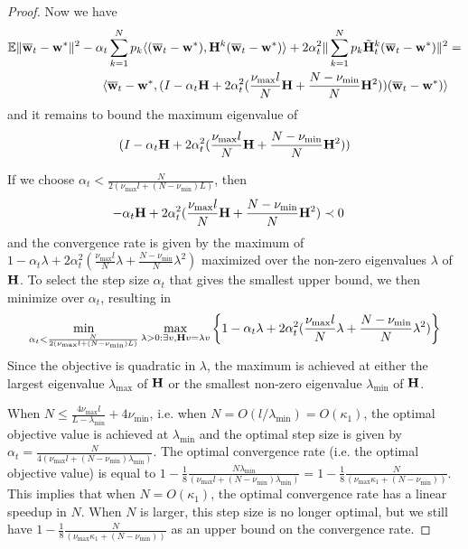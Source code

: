 \begin{proof}
	Now we have 
	\begin{align*}
	\mathbb{E}\|{\overline{\mathbf{w}}}_{t}-{\mathbf{w}}^{\ast}\|^{2}-\alpha_{t}\sum_{k=1}^{N}p_{k}\langle({\overline{\mathbf{w}}}_{t}-{\mathbf{w}}^{\ast}),{\mathbf{H}}^{k}({\overline{\mathbf{w}}}_{t}-{\mathbf{w}}^{\ast})\rangle+2\alpha_{t}^{2}\|\sum_{k=1}^{N}p_{k}\tilde{{\mathbf{H}}}_{t}^{k}({\overline{\mathbf{w}}}_{t}-{\mathbf{w}}^{\ast})\|^{2} & =\\
	\langle{\overline{\mathbf{w}}}_{t}-{\mathbf{w}}^{\ast},(I-\alpha_{t}{\mathbf{H}}+2\alpha_{t}^{2}(\frac{\nu_{\max}l}{N}{\mathbf{H}}+\frac{N-\nu_{\min}}{N}{\mathbf{H}}^{2}))({\overline{\mathbf{w}}}_{t}-{\mathbf{w}}^{\ast})\rangle
	\end{align*}
	and it remains to bound the maximum eigenvalue of 
	\begin{align*}
	(I-\alpha_{t}{\mathbf{H}}+2\alpha_{t}^{2}(\frac{\nu_{\max}l}{N}{\mathbf{H}}+\frac{N-\nu_{\min}}{N}{\mathbf{H}}^{2}))
	\end{align*}
	
	If we choose $\alpha_{t}<\frac{N}{2(\nu_{\max}l+(N-\nu_{\min})L)}$,
	then 
	\begin{align*}
	-\alpha_{t}{\mathbf{H}}+2\alpha_{t}^{2}(\frac{\nu_{\max}l}{N}{\mathbf{H}}+\frac{N-\nu_{\min}}{N}{\mathbf{H}}^{2}) & \prec0
	\end{align*}
	and the convergence rate is given by the maximum of $1-\alpha_{t}\lambda+2\alpha_{t}^{2}(\frac{\nu_{\max}l}{N}\lambda+\frac{N-\nu_{\min}}{N}\lambda^{2})$
	maximized over the non-zero eigenvalues $\lambda$ of ${\mathbf{H}}$. To select
	the step size $\alpha_{t}$ that gives the smallest upper bound, we
	then minimize over $\alpha_{t}$, resulting in 
	\begin{align*}
	\min_{\alpha_{t}<\frac{N}{2(\nu_{\max}l+(N-\nu_{\min})L)}}\max_{\lambda>0:\exists v,{\mathbf{H}} v=\lambda v}\left\{ 1-\alpha_{t}\lambda+2\alpha_{t}^{2}(\frac{\nu_{\max}l}{N}\lambda+\frac{N-\nu_{\min}}{N}\lambda^{2})\right\} 
	\end{align*}
	Since the objective is quadratic in $\lambda$, the maximum is achieved
	at either the largest eigenvalue $\lambda_{\max}$ of ${\mathbf{H}}$ or the
	smallest non-zero eigenvalue $\lambda_{\min}$ of ${\mathbf{H}}$. 
	
	When $N\leq\frac{4\nu_{\max}l}{L-\lambda_{\min}}+4\nu_{\min}$, i.e.
	when $N=O(l/\lambda_{\min})=O(\kappa_{1})$, the optimal objective
	value is achieved at $\lambda_{\min}$ and the optimal step size is
	given by $\alpha_{t}=\frac{N}{4(\nu_{\max}l+(N-\nu_{\min})\lambda_{\min})}$.
	The optimal convergence rate (i.e. the optimal objective value) is
	equal to $1-\frac{1}{8}\frac{N\lambda_{\min}}{(\nu_{\max}l+(N-\nu_{\min})\lambda_{\min})}=1-\frac{1}{8}\frac{N}{(\nu_{\max}\kappa_{1}+(N-\nu_{\min}))}$.
	This implies that when $N=O(\kappa_{1})$, the optimal convergence
	rate has a linear speedup in $N$. When $N$ is larger, this step
	size is no longer optimal, but we still have $1-\frac{1}{8}\frac{N}{(\nu_{\max}\kappa_{1}+(N-\nu_{\min}))}$
	as an upper bound on the convergence rate. 
	

\end{proof}

